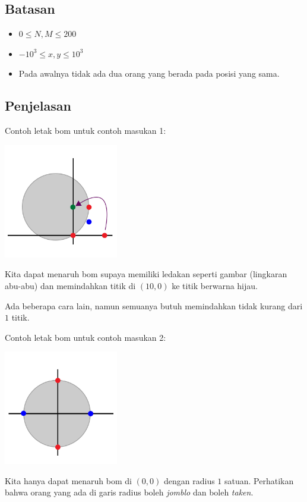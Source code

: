 \documentclass{article}
\begin{document}
\subsection*{Batasan}

\begin{itemize}
  \item $0 \leq N,M \leq 200$
  \item $-10^3 \leq x, y \leq 10^3$
  \item Pada awalnya tidak ada dua orang yang berada pada posisi yang sama.
\end{itemize}

\subsection*{Penjelasan}

\par\noindent Contoh letak bom untuk contoh masukan 1:

\includegraphics[width=5cm]{sample-1}

\par\noindent Kita dapat menaruh bom supaya memiliki ledakan seperti gambar (lingkaran abu-abu) dan memindahkan titik di $(10,0)$ ke titik berwarna hijau.

\par\noindent Ada beberapa cara lain, namun semuanya butuh memindahkan tidak kurang dari $1$ titik.

\par\noindent Contoh letak bom untuk contoh masukan 2:

\includegraphics[width=5cm]{sample-2}

\par\noindent Kita hanya dapat menaruh bom di $(0,0)$ dengan radius $1$ satuan. Perhatikan bahwa orang yang ada di garis radius boleh \textit{jomblo} dan boleh \textit{taken}.
\end{document}
